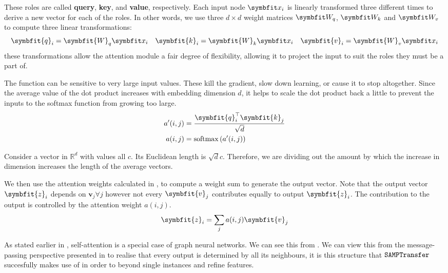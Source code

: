 These roles are called \textbf{query}, \textbf{key}, and \textbf{value}, respectively. Each input node $\bfitx_i$ is linearly transformed three different times to derive a new vector for each of the roles. In other words, we use three $d\times d$ weight matrices $\Wq$, $\Wk$ and $\Wv$ to compute three linear transformations:
\begin{equation}
    \symbfit{q}_{i}=\symbfit{W}_{q} \bfitx_{i} \quad \symbfit{k}_{i}=\symbfit{W}_{k} \bfitx_{i} \quad \symbfit{v}_{i}=\symbfit{W}_{v} \bfitx_{i}
\end{equation}
these transformations allow the attention module a fair degree of flexibility, allowing it to project the input to suit the roles they must be a part of. 

The  function can be sensitive to very large input values. These kill the gradient, slow down learning, or cause it to stop altogether. Since the average value of the dot product increases with embedding dimension $d$, it helps to scale the dot product back a little to prevent the inputs to the softmax function from growing too large.
\begin{equation}
\label{eqn:qkv-attn-weight-calc}
\begin{split}
    a^\prime(i, j) &= \frac{\symbfit{q}_i^\top \symbfit{k}_j}{\sqrt{d}}\\
    a(i, j) &= \operatorname{softmax}\left( a^\prime(i, j) \right)\\
\end{split}
\end{equation}

\begin{tcolorbox}[title=Why $\sqrt{d}$?]
Consider a vector in $\mathbb{R}^d$ with values all $c$. Its Euclidean length is $\sqrt{d}c$. Therefore, we are dividing out the amount by which the increase in dimension increases the length of the average vectors.
\end{tcolorbox}

We then use the attention weights calculated in , to compute a weight sum to generate the output vector. Note that the output vector $\symbfit{z}_i$ depends on $\symbf{v}_j \forall j$ however not every $\symbfit{v}_j$ contributes equally to output $\symbfit{z}_i$. The contribution to the output is controlled by the attention weight $a(i, j)$.
\begin{equation}
    \label{eqn:qkv-attn-aggregation}
    \symbfit{z}_{i}=\sum_{j} a(i, j) \symbfit{v}_{j}
\end{equation}

As stated earlier in , self-attention is a special case of graph neural networks. We can see this from . We can view this from the message-passing perspective presented in  to realise that every output is determined by all its neighbours, it is this structure that $\texttt{SAMPTransfer}$ succesfully makes use of in order to  beyond single instances and refine features.